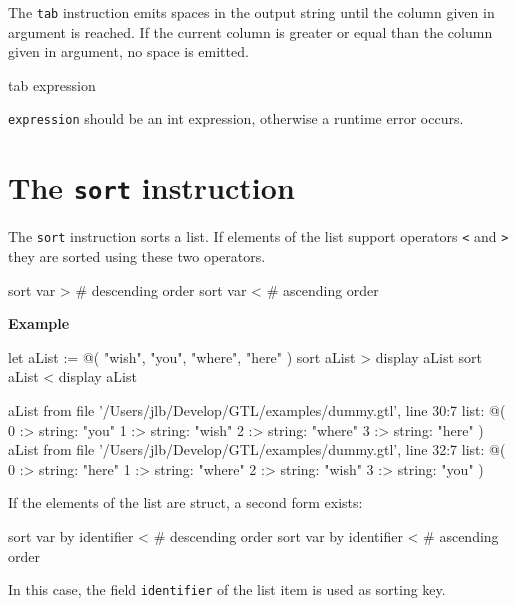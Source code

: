 \documentclass[10pt,openright,twosides,final]{memoir}
\newcommand{\gtltype}[1]{{\small\ttfamily #1}}
\newcommand{\gtlinline}[1]{\colorbox{light-blue}{\lstinline[language=gtl]{#1}}}
\newcommand{\example}{\vspace{.75em}\noindent\textbf{Example}\vspace{0em}}
\begin{document}
The \gtlinline{tab} instruction emits spaces in the output string until the column given in argument is reached. If the current column is greater or equal than the column given in argument, no space is emitted.

\begin{gtl}
tab expression
\end{gtl}

\gtlinline{expression} should be an \gtltype{int} expression, otherwise a runtime error occurs.

\section{The \texttt{sort} instruction}

The \gtlinline{sort} instruction sorts a \gtltype{list}. If elements of the list support operators \gtlinline{<} and \gtlinline{>} they are sorted using these two operators.

\begin{gtl}
sort var > # descending order
sort var < # ascending order
\end{gtl}

\example
\begin{gtl}
let aList := @( "wish", "you", "where", "here" )
sort aList >
display aList
sort aList <
display aList
\end{gtl}
\begin{console}
aList from file '/Users/jlb/Develop/GTL/examples/dummy.gtl', line 30:7
    list: @(
        0 :>
            string: "you"
        1 :>
            string: "wish"
        2 :>
            string: "where"
        3 :>
            string: "here"
    )
aList from file '/Users/jlb/Develop/GTL/examples/dummy.gtl', line 32:7
    list: @(
        0 :>
            string: "here"
        1 :>
            string: "where"
        2 :>
            string: "wish"
        3 :>
            string: "you"
    )
\end{console}

If the elements of the list are \gtltype{struct}, a second form exists:

\begin{gtl}
sort var by identifier < # descending order
sort var by identifier < # ascending order
\end{gtl}

In this case, the field \gtlinline{identifier} of the list item is used as sorting key.
\end{document}
